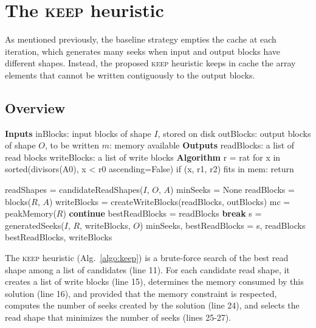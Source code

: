 \documentclass[sigconf, nonacm]{acmart}
\newcommand{\tristan}[1]{\fxnote{\small \color{red} \textbf{From Tristan:}#1} \color{black}}
\newcommand{\keep}[0]{\textsc{keep}\xspace}
\begin{document}
\section{The \keep heuristic}
As mentioned previously, the baseline strategy empties
the cache at each iteration, which generates many seeks when input and output
blocks have different shapes. Instead, the proposed
\keep heuristic keeps in cache the array elements that cannot be written
contiguously to the output blocks.

\subsection{Overview}

\begin{algorithm}
  \caption{\keep heuristic (implements \texttt{getReadWriteBlocks}) \tristan{update}}
  \label{algo:keep}
  \begin{algorithmic}[1]
    \STATE \textbf{Inputs}
    \STATE inBlocks: input blocks of shape $I$, stored on disk
    \STATE outBlocks: output blocks of shape $O$, to be written
    \STATE $m$: memory available
    \STATE
    \STATE \textbf{Outputs}
    \STATE readBlocks: a list of read blocks
    \STATE writeBlocks: a list of write blocks
    \STATE
    \STATE \textbf{Algorithm}
    r = rat 
    for x in sorted(divisors(A0), x < r0 ascending=False)
      if (x, r1, r2) fits in mem:
          return

    \STATE readShapes = candidateReadShapes($I$, $O$, $A$)
    \STATE minSeeks = None
      \STATE readBlocks = blocks($R$, $A$)
      \STATE writeBlocks = createWriteBlocks(readBlocks, outBlocks)
      \STATE mc = peakMemory($R$)
      \STATE \textbf{continue} 
      \ENDIF
      \STATE bestReadBlocks = readBlocks
      \STATE \textbf{break} 
      \ENDIF
      \STATE s = generatedSeeks($I$, $R$, writeBlocks, $O$)
      \STATE minSeeks, bestReadBlocks = s, readBlocks
      \ENDIF
    \ENDFOR
    \RETURN bestReadBlocks, writeBlocks
  \end{algorithmic}
\end{algorithm}
The \keep heuristic (Alg.~\ref{algo:keep}) is a brute-force search
of the best read shape among a list of candidates (line 11).
For each candidate read shape, it creates a list of write blocks (line
15), determines the memory consumed by this solution (line 16), and provided that the
memory constraint is respected, computes
the number of seeks created by the solution (line
24), and selects the read shape that minimizes the number of seeks (lines
25-27).
\end{document}
